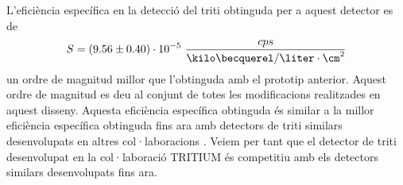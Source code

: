 L'eficiència específica en la detecció del triti obtinguda per a aquest detector es de
$$S = (9.56 \pm 0.40)\cdot{} 10^{-5}~\frac{cps}{\kilo\becquerel/\liter \cdot{} \cm^{2}}$$
un ordre de magnitud millor que l'obtinguda amb el prototip anterior. Aquest ordre de magnitud es deu al conjunt de totes les modificacions realitzades en aquest disseny. Aquesta eficiència específica obtinguda és similar a la millor eficiència específica obtinguda fins ara amb detectors de triti similars desenvolupats en altres col·laboracions \cite{Hofstetter1, Hofstetter2}. Veiem per tant que el detector de triti desenvolupat en la col·laboració TRITIUM és competitiu amb els detectors similars desenvolupats fins ara.